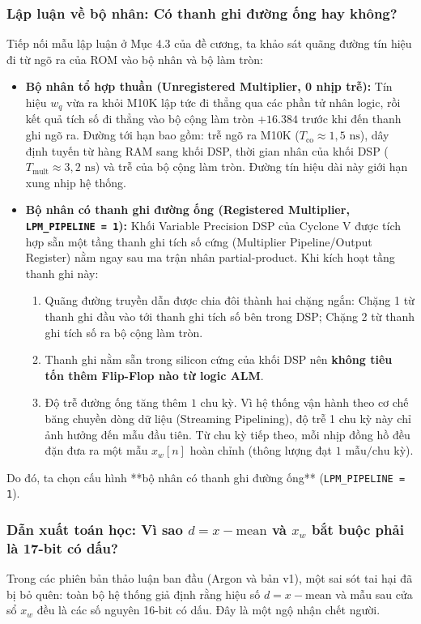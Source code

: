 \subsubsection*{Lập luận về bộ nhân: Có thanh ghi đường ống hay không?}
Tiếp nối mẫu lập luận ở Mục 4.3 của đề cương, ta khảo sát quãng đường tín hiệu đi từ ngõ ra của ROM vào bộ nhân và bộ làm tròn:
\begin{itemize}[leftmargin=1.5em, itemsep=2pt]
    \item \textbf{Bộ nhân tổ hợp thuần (Unregistered Multiplier, 0 nhịp trễ):} Tín hiệu $w_q$ vừa ra khỏi M10K lập tức đi thẳng qua các phần tử nhân logic, rồi kết quả tích số đi thẳng vào bộ cộng làm tròn $+16.384$ trước khi đến thanh ghi ngõ ra. Đường tới hạn bao gồm: trễ ngõ ra M10K ($T_{\text{co}} \approx 1{,}5\text{ ns}$), dây định tuyến từ hàng RAM sang khối DSP, thời gian nhân của khối DSP ($T_{\text{mult}} \approx 3{,}2\text{ ns}$) và trễ của bộ cộng làm tròn. Đường tín hiệu dài này giới hạn xung nhịp hệ thống.
    \item \textbf{Bộ nhân có thanh ghi đường ống (Registered Multiplier, \texttt{LPM\_PIPELINE = 1}):} Khối Variable Precision DSP của Cyclone V được tích hợp sẵn một tầng thanh ghi tích số cứng (Multiplier Pipeline/Output Register) nằm ngay sau ma trận nhân partial-product. Khi kích hoạt tầng thanh ghi này:
    \begin{enumerate}[label=(\alph*), itemsep=1pt]
        \item Quãng đường truyền dẫn được chia đôi thành hai chặng ngắn: Chặng 1 từ thanh ghi đầu vào tới thanh ghi tích số bên trong DSP; Chặng 2 từ thanh ghi tích số ra bộ cộng làm tròn.
        \item Thanh ghi nằm sẵn trong silicon cứng của khối DSP nên \textbf{không tiêu tốn thêm Flip-Flop nào từ logic ALM}.
        \item Độ trễ đường ống tăng thêm $1\text{ chu kỳ}$. Vì hệ thống vận hành theo cơ chế băng chuyền dòng dữ liệu (Streaming Pipelining), độ trễ 1 chu kỳ này chỉ ảnh hưởng đến mẫu đầu tiên. Từ chu kỳ tiếp theo, mỗi nhịp đồng hồ đều đặn đưa ra một mẫu $x_w[n]$ hoàn chỉnh (thông lượng đạt $1\text{ mẫu/chu kỳ}$).
    \end{enumerate}
\end{itemize}
Do đó, ta chọn cấu hình **bộ nhân có thanh ghi đường ống** (\texttt{LPM\_PIPELINE = 1}).

\subsubsection*{Dẫn xuất toán học: Vì sao $d = x - \text{mean}$ và $x_w$ bắt buộc phải là 17-bit có dấu?}
Trong các phiên bản thảo luận ban đầu (Argon và bản v1), một sai sót tai hại đã bị bỏ quên: toàn bộ hệ thống giả định rằng hiệu số $d = x - \text{mean}$ và mẫu sau cửa sổ $x_w$ đều là các số nguyên 16-bit có dấu. Đây là một ngộ nhận chết người.

